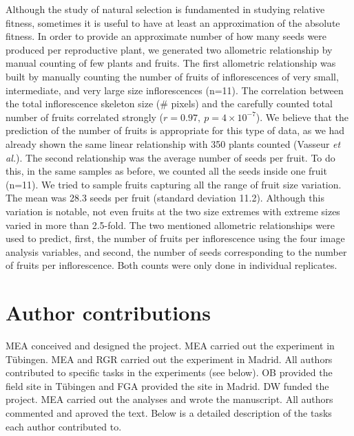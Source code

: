 \documentclass[12pt,]{article}
\begin{document}
Although the study of natural selection is fundamented in studying
relative fitness, sometimes it is useful to have at least an
approximation of the absolute fitness. In order to provide an
approximate number of how many seeds were produced per reproductive
plant, we generated two allometric relationship by manual counting of
few plants and fruits. The first allometric relationship was built by
manually counting the number of fruits of inflorescences of very small,
intermediate, and very large size inflorescences (n=11). The correlation
between the total inflorescence skeleton size (\# pixels) and the
carefully counted total number of fruits correlated strongly
(\(r=0.97,\ p= 4 \times 10^{-7}\)). We believe that the prediction of
the number of fruits is appropriate for this type of data, as we had
already shown the same linear relationship with 350 plants counted
(Vasseur \emph{et al.}). The second relationship was the average number
of seeds per fruit. To do this, in the same samples as before, we
counted all the seeds inside one fruit (n=11). We tried to sample fruits
capturing all the range of fruit size variation. The mean was 28.3 seeds
per fruit (standard deviation 11.2). Although this variation is notable,
not even fruits at the two size extremes with extreme sizes varied in
more than 2.5-fold. The two mentioned allometric relationships were used
to predict, first, the number of fruits per inflorescence using the four
image analysis variables, and second, the number of seeds corresponding
to the number of fruits per inflorescence. Both counts were only done in
individual replicates.

\section{Author contributions}\label{author-contributions}

MEA conceived and designed the project. MEA carried out the experiment
in Tübingen. MEA and RGR carried out the experiment in Madrid. All
authors contributed to specific tasks in the experiments (see below). OB
provided the field site in Tübingen and FGA provided the site in Madrid.
DW funded the project. MEA carried out the analyses and wrote the
manuscript. All authors commented and aproved the text. Below is a
detailed description of the tasks each author contributed to.
\end{document}
